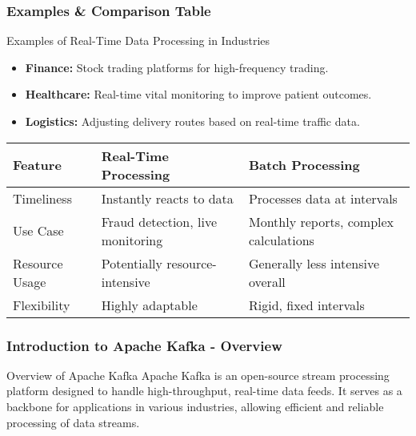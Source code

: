 \documentclass[aspectratio=169]{beamer}
\begin{document}
\begin{frame}[fragile]
    \frametitle{Examples & Comparison Table}
    \begin{block}{Examples of Real-Time Data Processing in Industries}
        \begin{itemize}
            \item \textbf{Finance:} Stock trading platforms for high-frequency trading.
            \item \textbf{Healthcare:} Real-time vital monitoring to improve patient outcomes.
            \item \textbf{Logistics:} Adjusting delivery routes based on real-time traffic data.
        \end{itemize}
    \end{block}
    
    \begin{table}[h]
        \centering
        \begin{tabular}{|l|l|l|}
            \hline
            \textbf{Feature} & \textbf{Real-Time Processing} & \textbf{Batch Processing} \\ \hline
            Timeliness & Instantly reacts to data & Processes data at intervals \\ \hline
            Use Case & Fraud detection, live monitoring & Monthly reports, complex calculations \\ \hline
            Resource Usage & Potentially resource-intensive & Generally less intensive overall \\ \hline
            Flexibility & Highly adaptable & Rigid, fixed intervals \\ \hline
        \end{tabular}
    \end{table}
\end{frame}

\begin{frame}[fragile]
    \frametitle{Introduction to Apache Kafka - Overview}
    \begin{block}{Overview of Apache Kafka}
        Apache Kafka is an open-source stream processing platform designed to handle high-throughput, real-time data feeds. 
        It serves as a backbone for applications in various industries, allowing efficient and reliable processing of data streams.
    \end{block}
\end{frame}
\end{document}
